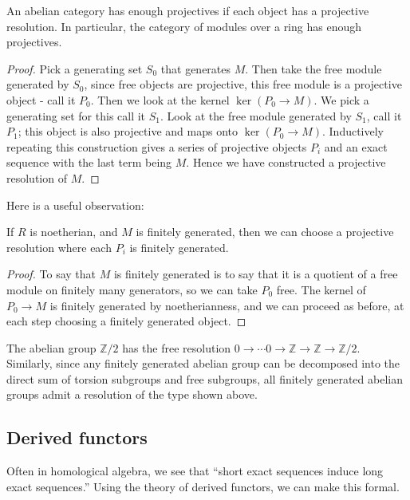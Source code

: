 \begin{theorem}An abelian category has enough projectives if
each object has a
projective resolution. In particular, the category of modules
over a ring has
enough projectives. \end{theorem}
\begin{proof} Pick a generating set $S_0$ that generates $M$.
Then take the free
module generated by $S_0$, since free objects are projective,
this free module
is a projective object - call it $P_0$. Then we look at the
kernel
$\ker(P_0\rightarrow M)$. We pick a generating set for this call
it $S_1$. Look
at the free module generated by $S_1$, call it $P_1$; this
object is also
projective and maps onto $\ker(P_0\rightarrow M)$. Inductively
repeating this
construction gives a series of projective objects $P_i$ and an
exact sequence
with the last term being $M$. Hence we have constructed a
projective resolution
of $M$. \end{proof}

Here is a useful observation:
\begin{proposition} 
If $R$ is noetherian, and $M$ is finitely generated, then we can
choose a
projective resolution where each $P_i$ is finitely generated. 
\end{proposition} 
\begin{proof} 
To say that $M$ is finitely generated is to say that it is a
quotient of a free module on
finitely many generators, so we can take $P_0$ free. The kernel
of $P_0 \to M$
is finitely generated by noetherianness, and we can proceed as
before, at each step
choosing a finitely generated object. 
\end{proof} 
\begin{example} The abelian group $\mathbb{Z}/2$ has the free
resolution $0\rightarrow\cdots
0\rightarrow\mathbb{Z}\rightarrow\mathbb{Z}\rightarrow\mathbb{Z}/2$.
Similarly, since any finitely generated abelian group can be
decomposed into the direct sum of torsion subgroups and free
subgroups, all finitely generated abelian groups admit a
resolution of the type shown above.\end{example}

\subsection{Derived functors}
Often in homological algebra, we see that ``short exact
sequences induce long exact sequences.'' Using the theory of
derived functors, we can make this formal.

